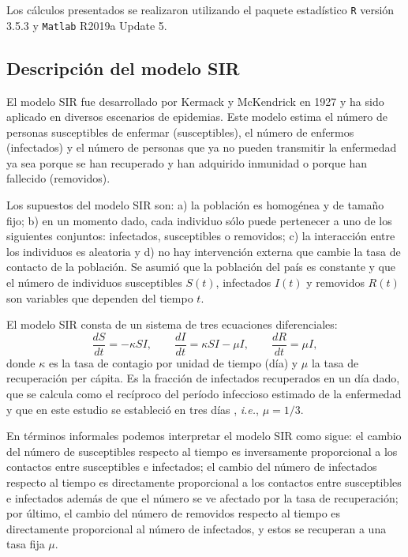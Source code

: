 \documentclass[12pt]{article}
\begin{document}
	Los cálculos presentados se realizaron utilizando el paquete estadístico \texttt{R} versión 3.5.3 y \texttt{Matlab} R2019a Update 5.
	
	
	\subsection*{Descripción del modelo SIR}
	
	El modelo SIR fue desarrollado por Kermack y McKendrick en 1927 \cite{Bacaer2011} y ha sido aplicado en diversos escenarios de epidemias. Este modelo estima el número de personas susceptibles de enfermar (susceptibles), el número de enfermos (infectados) y el número de personas que ya no pueden transmitir la enfermedad ya sea porque se han recuperado y han adquirido inmunidad o porque han fallecido (removidos).
	
	Los supuestos del modelo SIR son: a) la población es homogénea y de tamaño fijo; b) en un momento dado, cada individuo sólo puede pertenecer a uno de los siguientes conjuntos: infectados, susceptibles o removidos; c) la interacción entre los individuos es aleatoria y d) no hay intervención externa que cambie la tasa de contacto de la población. Se asumió que la población del país es constante y que el número de individuos susceptibles $ S(t) $, infectados $ I(t) $ y removidos $ R(t) $ son variables que dependen del tiempo $ t $. 
	
	El modelo SIR consta de un sistema de tres ecuaciones diferenciales:
	\[ \frac{dS}{dt} = -\kappa S I, \qquad \frac{dI}{dt} = \kappa SI - \mu I, \qquad \frac{dR}{dt} = \mu I, \]
	donde $ \kappa $ es la tasa de contagio por unidad de tiempo (día) y $ \mu $ la tasa de recuperación per cápita. Es la fracción de infectados recuperados en un día dado, que se calcula como el recíproco del período infeccioso estimado de la enfermedad y que en este estudio se estableció en tres días \cite{Fielding2014}, \textit{i.e.}, $ \mu = 1/3 $.
	
	En términos informales podemos interpretar el modelo SIR como sigue: el cambio del número de susceptibles respecto al tiempo es inversamente proporcional a los contactos entre susceptibles e infectados; el cambio del número de infectados respecto al tiempo es directamente proporcional a los contactos entre susceptibles e infectados además de que el número se ve afectado por la tasa de recuperación; por último, el cambio del número de removidos respecto al tiempo es directamente proporcional al número de infectados, y estos se recuperan a una tasa fija $ \mu $.
	
\end{document}
